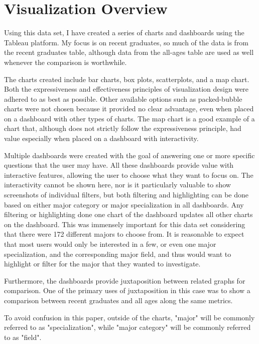 \documentclass[sigchi]{acmart}
\begin{document}
\section{Visualization Overview}

Using this data set, I have created a series of charts and dashboards using the Tableau platform. My focus is on recent graduates, so much of the data is from the recent graduates table, although data from the all-ages table are used as well whenever the comparison is worthwhile. 

The charts created include bar charts, box plots, scatterplots, and a map chart. Both the expressiveness and effectiveness principles of visualization design \cite{munzner} were adhered to as best as possible. Other available options such as packed-bubble charts were not chosen because it provided no clear advantage, even when placed on a dashboard with other types of charts. The map chart is a good example of a chart that, although does not strictly follow the expressiveness principle, had value especially when placed on a dashboard with interactivity.

Multiple dashboards were created with the goal of answering one or more specific questions that the user may have. All these dashboards provide value with interactive features, allowing the user to choose what they want to focus on. The interactivity cannot be shown here, nor is it particularly valuable to show screenshots of individual filters, but both filtering and highlighting can be done based on either major category or major specialization in all dashboards. Any filtering or highlighting done one chart of the dashboard updates all other charts on the dashboard. This was immensely important for this data set considering that there were 172 different majors to choose from. It is reasonable to expect that most users would only be interested in a few, or even one major specialization, and the corresponding major field, and thus would want to highlight or filter for the major that they wanted to investigate.

Furthermore, the dashboards provide juxtaposition between related graphs for comparison. One of the primary uses of juxtaposition in this case was to show a comparison between recent graduates and all ages along the same metrics. 

To avoid confusion in this paper, outside of the charts, "major" will be commonly referred to as "specialization", while "major category" will be commonly referred to as "field".
\end{document}
